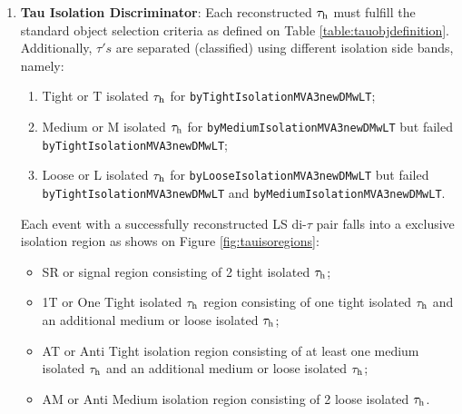 \begin{enumerate}
	\item \textbf{Tau Isolation Discriminator}: Each reconstructed $\tau_{\text{h}}$ must fulfill the standard object selection criteria as defined on Table \ref{table:tauobjdefinition}. Additionally, $\tau's$ are separated (classified) using different isolation side bands, namely:
	
	\begin{enumerate}
		\item Tight or T isolated $\tau_{\text{h}}$ for \texttt{byTight\-IsolationMVA3newDMwLT};
		\item Medium or M isolated $\tau_{\text{h}}$ for \texttt{byMedium\-IsolationMVA3newDMwLT} but failed \texttt{byTight\-IsolationMVA3newDMwLT};
		\item Loose or L isolated $\tau_{\text{h}}$  for \texttt{byLoose\-IsolationMVA3newDMwLT} but failed \texttt{byTight\-IsolationMVA3newDMwLT} and \texttt{byMedium\-IsolationMVA3newDMwLT}.
	\end{enumerate}
	
	Each event with a successfully reconstructed LS di-$\tau$ pair falls into a exclusive isolation region as shows on Figure \ref{fig:tauisoregions}:
	
	\begin{itemize}
		\item SR or signal region consisting of 2 tight isolated $\tau_{\text{h}}$;
		\item 1T or One Tight isolated $\tau_{\text{h}}$ region consisting of one tight isolated $\tau_{\text{h}}$ and an additional medium or loose isolated $\tau_{\text{h}}$;
		\item AT or Anti Tight isolation region consisting of at least one medium isolated $\tau_{\text{h}}$ and an additional medium or loose isolated $\tau_{\text{h}}$;
		\item AM or Anti Medium isolation region consisting of 2 loose isolated $\tau_{\text{h}}$.
	\end{itemize}
	

\end{enumerate}

